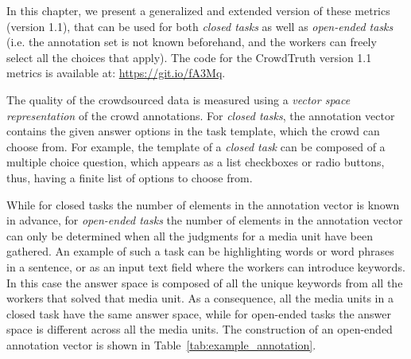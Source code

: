 In this chapter, we present a generalized and extended version of these metrics (version 1.1), that can be used for both \textit{closed tasks} as well as \textit{open-ended tasks} (i.e. the annotation set is not known beforehand, and the workers can freely select all the choices that apply). The code for the CrowdTruth version 1.1 metrics is available at: \url{https://git.io/fA3Mq}.

The quality of the crowdsourced data is measured using a \textit{vector space representation} of the crowd annotations. For \emph{closed tasks}, the annotation vector contains the given answer options in the task template, which the crowd can choose from. For example, the template of a \emph{closed task} can be composed of a multiple choice question, which appears as a list checkboxes or radio buttons, thus, having a finite list of options to choose from.

While for closed tasks the number of elements in the annotation vector is known in advance, for \emph{open-ended tasks} the number of elements in the annotation vector can only be determined when all the judgments for a media unit have been gathered. An example of such a task can be highlighting words or word phrases in a sentence, or as an input text field where the workers can introduce keywords. In this case the answer space is composed of all the unique keywords from all the workers that solved that media unit. As a consequence, all the media units in a closed task have the same answer space, while for open-ended tasks the answer space is different across all the media units. The construction of an open-ended annotation vector is shown in Table~\ref{tab:example_annotation}.

\begin{table}[htb!]
	\caption {Consider an open-ended sound annotation task where 10 workers have to describe a given sound with keywords. The media unit for this task is a sound, the annotation set contains all the keywords workers provide for a sound. The table shows the media unit metrics, as well as the majority vote score for the media unit.}
    \label{tab:example_annotation}
\end{table}

